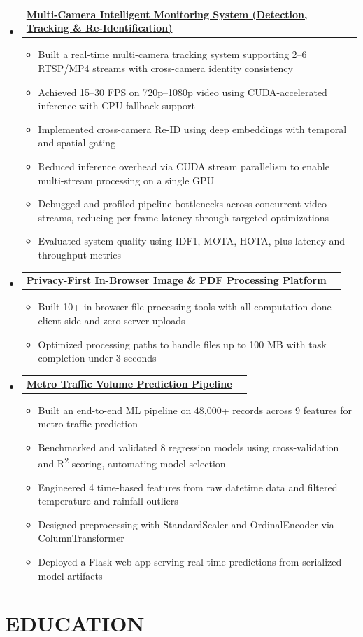 \documentclass[letterpaper,10pt]{article}
\makeatletter
\newcommand{\resumeItem}[1]{
  \item\small{{#1 \vspace{-1pt}}}
}
\newcommand{\resumeProjectHeading}[2]{
\item
\begin{tabular*}{\textwidth}{l@{\extracolsep{\fill}}r}
#1 & {\color{dark-grey}} \\
\end{tabular*}\vspace{-5pt}
}
\newcommand{\resumeSubHeadingListStart}{\begin{itemize}[leftmargin=0in,label={},itemsep=2pt,topsep=3pt,parsep=0pt,partopsep=0pt]}
\newcommand{\resumeSubHeadingListEnd}{\end{itemize}}
\newcommand{\resumeItemListStart}{\begin{itemize}[leftmargin=0.2in,itemsep=2pt,topsep=2pt,parsep=0pt,partopsep=0pt]}
\newcommand{\resumeItemListEnd}{\end{itemize}\vspace{0pt}}
\makeatother
\begin{document}
\resumeSubHeadingListStart

\resumeProjectHeading{\textbf{\href{https://github.com/SoniPrithish/multi_camera_tracking_system}{Multi-Camera Intelligent Monitoring System (Detection, Tracking \& Re-Identification)}}}{}

\resumeItemListStart
\resumeItem{Built a real-time multi-camera tracking system supporting 2--6 RTSP/MP4 streams with cross-camera identity consistency}
\resumeItem{Achieved 15--30 FPS on 720p--1080p video using CUDA-accelerated inference with CPU fallback support}
\resumeItem{Implemented cross-camera Re-ID using deep embeddings with temporal and spatial gating}
\resumeItem{Reduced inference overhead via CUDA stream parallelism to enable multi-stream processing on a single GPU}
\resumeItem{Debugged and profiled pipeline bottlenecks across concurrent video streams, reducing per-frame latency through targeted optimizations}
\resumeItem{Evaluated system quality using IDF1, MOTA, HOTA, plus latency and throughput metrics}
\resumeItemListEnd

\resumeProjectHeading{\textbf{\href{https://prithish.me}{Privacy-First In-Browser Image \& PDF Processing Platform}}}{}

\resumeItemListStart
\resumeItem{Built 10+ in-browser file processing tools with all computation done client-side and zero server uploads}
\resumeItem{Optimized processing paths to handle files up to 100 MB with task completion under 3 seconds}
\resumeItemListEnd

\resumeProjectHeading{\textbf{\href{https://github.com/SoniPrithish/MetroTrafficVolume}{Metro Traffic Volume Prediction Pipeline}}}{}

\resumeItemListStart
\resumeItem{Built an end-to-end ML pipeline on 48,000+ records across 9 features for metro traffic prediction}
\resumeItem{Benchmarked and validated 8 regression models using cross-validation and R\textsuperscript{2} scoring, automating model selection}
\resumeItem{Engineered 4 time-based features from raw datetime data and filtered temperature and rainfall outliers}
\resumeItem{Designed preprocessing with StandardScaler and OrdinalEncoder via ColumnTransformer}
\resumeItem{Deployed a Flask web app serving real-time predictions from serialized model artifacts}
\resumeItemListEnd

\resumeSubHeadingListEnd

\section{EDUCATION}
\end{document}
